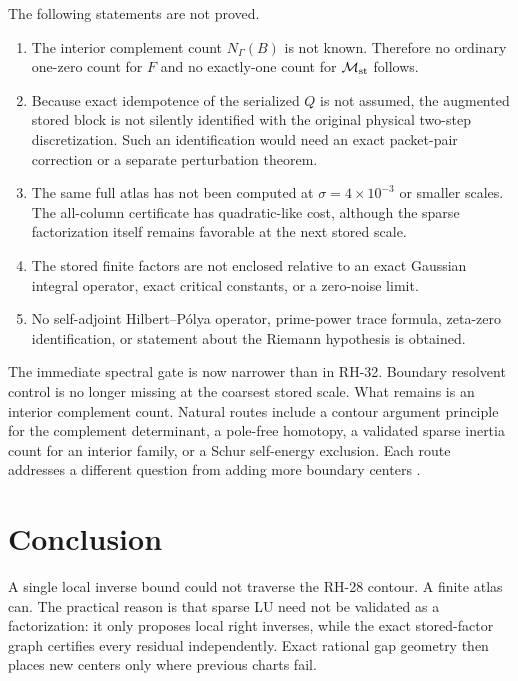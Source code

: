 \documentclass[11pt]{article}
\theoremstyle{definition}
\theoremstyle{remark}
\newcommand{\Maug}{\mathcal M_{\rm st}}
\begin{document}
The following statements are not proved.

\begin{enumerate}
 \item The interior complement count $N_\Gamma(B)$ is not known.  Therefore
       no ordinary one-zero count for $F$ and no exactly-one count for
       $\Maug$ follows.
 \item Because exact idempotence of the serialized $Q$ is not assumed, the
       augmented stored block is not silently identified with the original
       physical two-step discretization.  Such an identification would need
       an exact packet-pair correction or a separate perturbation theorem.
 \item The same full atlas has not been computed at
       $\sigma=4\times10^{-3}$ or smaller scales.  The all-column certificate
       has quadratic-like cost, although the sparse factorization itself
       remains favorable at the next stored scale.
 \item The stored finite factors are not enclosed relative to an exact
       Gaussian integral operator, exact critical constants, or a zero-noise
       limit.
 \item No self-adjoint Hilbert--P\'olya operator, prime-power trace formula,
       zeta-zero identification, or statement about the Riemann hypothesis
       is obtained.
\end{enumerate}

The immediate spectral gate is now narrower than in RH-32.  Boundary
resolvent control is no longer missing at the coarsest stored scale.  What
remains is an interior complement count.  Natural routes include a contour
argument principle for the complement determinant, a pole-free homotopy, a
validated sparse inertia count for an interior family, or a Schur
self-energy exclusion.  Each route addresses a different question from
adding more boundary centers \citep{SjoestrandZworski2007,TrefethenEmbree2005}.

\section{Conclusion}
\label{sec:conclusion}

A single local inverse bound could not traverse the RH-28 contour.  A finite
atlas can.  The practical reason is that sparse LU need not be validated as
a factorization: it only proposes local right inverses, while the exact
stored-factor graph certifies every residual independently.  Exact rational
gap geometry then places new centers only where previous charts fail.
\end{document}
